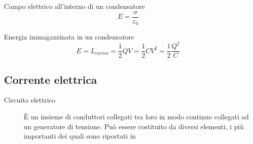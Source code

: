 \documentclass[a4paper,11pt,italian]{article}
\begin{document}
\begin{description}
\begin{soloscientifico} %
  \item[Campo elettrico all'interno di un condensatore]
  \[ E = \frac{\sigma}{\varepsilon_0} \]
  
  \item[Energia immagazzinata in un condensatore]
  \[ E = L_{carica} = \frac{1}{2} QV = \frac{1}{2} CV^2 = \frac{1}{2} \frac{Q^2}{C} \]
\end{soloscientifico}   %
\end{description}

\subsection{Corrente elettrica}
\begin{description}
  \item[Circuito elettrico]
  È un insieme di conduttori collegati tra loro in modo continuo collegati ad un generatore di tensione.
  Può essere costituito da diversi elementi, i più importanti dei quali sono riportati in 
  

\end{description}
\end{document}
